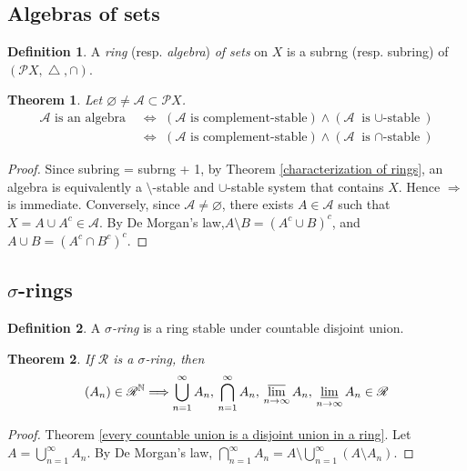 \documentclass[11pt, a4paper, openany]{book}
\newtheorem{thm}{Theorem}\newtheorem{lem}{Lemma}\newtheorem{crl}{Corollary}
\theoremstyle{definition}
\newtheorem{define}{Definition}\newtheorem{exam}{Example}\newtheorem{remark}{Remark}
\DeclareMathOperator{\symdif}{\triangle}
\begin{document}
\subsection{Algebras of sets}
    \begin{define}
        A \textit{ring} (resp. \textit{algebra}) \textit{of sets} on $X$ is a subrng (resp. subring) of $(\mathscr{P}X,\symdif,\cap)$.
    \end{define}
    \begin{thm}\label{characterization of algebras}
        Let $\varnothing\neq \mathscr{A}\subset\mathscr{P}X$.
        \begin{align*}
            \mathscr{A}\text{ is an algebra}\,\,&\Longleftrightarrow\,\,(\mathscr{A}\text{ is complement-stable})\wedge (\mathscr{A}\text{ is $\cup$-stable})\\
            &\Longleftrightarrow\,\,(\mathscr{A}\text{ is complement-stable})\wedge (\mathscr{A}\text{ is $\cap$-stable})
        \end{align*}
    \end{thm}
    \begin{proof}
            Since subring = subrng + 1, by Theorem \ref{characterization of rings}, an algebra is equivalently a $\setminus$-stable and $\cup$-stable system that contains $X$. Hence $\Rightarrow$ is immediate. Conversely, since $\mathscr{A}\neq\varnothing$, there exists $A\in\mathscr{A}$ such that $X=A\cup A^c\in\mathscr{A}$. By De Morgan's law,$A\setminus B=(A^c\cup B)^c$, and $A\cup B=(A^c\cap B^c)^c$.
    \end{proof}
\subsection{\texorpdfstring{$\sigma$}{sigma}-rings}
    \begin{define}
        A $\sigma$\textit{-ring} is a ring stable under countable disjoint union.
    \end{define}
    \begin{thm}\label{property of sigma rings}
        If $\mathscr{R}$ is a $\sigma$-ring, then
        \[
            (A_n)\in \mathscr{R}^\mathbb{N}\Longrightarrow \bigcup_{n=1}^\infty A_n,\,\bigcap_{n=1}^\infty A_n,\,\varlimsup_{n\to\infty}A_n,\,\varliminf_{n\to\infty}A_n\in\mathscr{R}
        \]
    \end{thm}
    \begin{proof}
        Theorem \ref{every countable union is a disjoint union in a ring}. Let $A=\bigcup_{n=1}^\infty A_n$. By De Morgan's law, $\bigcap_{n=1}^\infty A_n=A\setminus \bigcup_{n=1}^\infty (A\setminus A_n)$.
    \end{proof}
\end{document}

